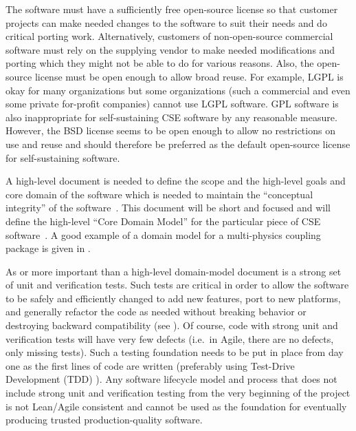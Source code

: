 \documentclass[11pt]{SANDreport}
\begin{document}
The software must have a sufficiently free open-source license so that
customer projects can make needed changes to the software to suit
their needs and do critical porting work.  Alternatively, customers of
non-open-source commercial software must rely on the supplying vendor
to make needed modifications and porting which they might not be able
to do for various reasons.  Also, the open-source license must be open
enough to allow broad reuse.  For example, LGPL is okay for many
organizations but some organizations (such a commercial and even some
private for-profit companies) cannot use LGPL software.  GPL software
is also inappropriate for self-sustaining CSE software by any
reasonable measure.  However, the BSD license seems to be open enough
to allow no restrictions on use and reuse and should therefore be
preferred as the default open-source license for self-sustaining
software.

A high-level document is needed to define the scope and the high-level
goals and core domain of the software which is needed to maintain the
``conceptual integrity'' of the software~\cite{MythicalManMonth95}.
This document will be short and focused and will define the high-level
``Core Domain Model'' for the particular piece of CSE
software~\cite{DomainDrivenDesign}.  A good example of a domain model
for a multi-physics coupling package is given in {}\cite{LIMEtheory}.

As or more important than a high-level domain-model document is a
strong set of unit and verification tests.  Such tests are critical in
order to allow the software to be safely and efficiently changed to
add new features, port to new platforms, and generally refactor the
code as needed without breaking behavior or destroying backward
compatibility (see {}\cite{WorkingEffectivelyWithLegacyCode05}).  Of
course, code with strong unit and verification tests will have very
few defects (i.e.\ in Agile, there are no defects, only missing
tests).  Such a testing foundation needs to be put in place from day
one as the first lines of code are written (preferably using
Test-Drive Development (TDD) {}\cite{TDD}).  Any software lifecycle
model and process that does not include strong unit and verification
testing from the very beginning of the project is not Lean/Agile
consistent and cannot be used as the foundation for eventually
producing trusted production-quality software.
\end{document}
